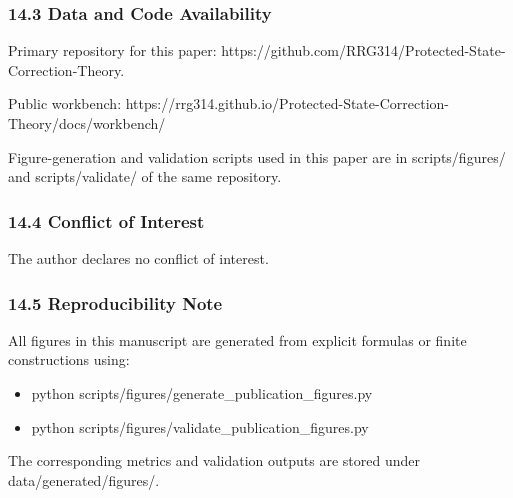 \documentclass[11pt]{article}
\begin{document}
\subsubsection*{14.3 Data and Code Availability}
Primary repository for this paper: https://github.com/RRG314/Protected-State-Correction-Theory.

Public workbench: https://rrg314.github.io/Protected-State-Correction-Theory/docs/workbench/

Figure-generation and validation scripts used in this paper are in scripts/figures/ and scripts/validate/ of the same repository.


\subsubsection*{14.4 Conflict of Interest}
The author declares no conflict of interest.


\subsubsection*{14.5 Reproducibility Note}
All figures in this manuscript are generated from explicit formulas or finite constructions using:

\begin{itemize}
\item python scripts/figures/generate\_publication\_figures.py
\item python scripts/figures/validate\_publication\_figures.py
\end{itemize}
The corresponding metrics and validation outputs are stored under data/generated/figures/.
\end{document}
